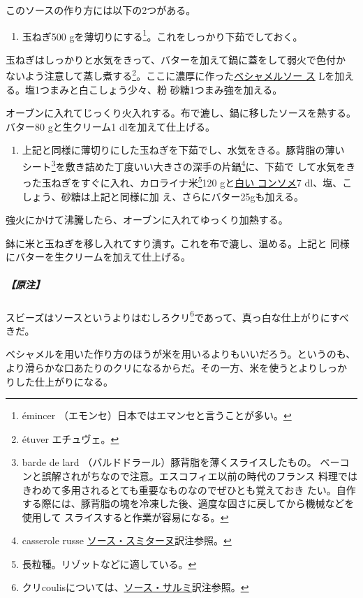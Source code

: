 \begin{recette}
このソースの作り方には以下の2つがある。

\begin{enumerate}
\def\labelenumi{\arabic{enumi}.}
\tightlist
\item
  玉ねぎ500 gを薄切りにする\footnote{émincer
    （エモンセ）日本ではエマンセと言うことが多い。}。これをしっかり下茹でしておく。
\end{enumerate}

玉ねぎはしっかりと水気をきって、バターを加えて鍋に蓋をして弱火で色付か
ないよう注意して蒸し煮する\footnote{étuver エチュヴェ。}。ここに濃厚に作った\protect\hyperlink{sauce-bechamel}{ベシャメルソー
ス}\undemi{} Lを加える。塩1つまみと白こしょう少々、粉
砂糖1つまみ強を加える。

オーブンに入れてじっくり火入れする。布で漉し、鍋に移したソースを熱する。
バター80 gと生クリーム1 dlを加えて仕上げる。

\begin{enumerate}
\def\labelenumi{\arabic{enumi}.}
\setcounter{enumi}{1}
\tightlist
\item
  上記と同様に薄切りにした玉ねぎを下茹でし、水気をきる。豚背脂の薄い
  シート\footnote{barde de lard
    （バルドドラール）豚背脂を薄くスライスしたもの。
    ベーコンと誤解されがちなので注意。エスコフィエ以前の時代のフランス
    料理ではきわめて多用されるとても重要なものなのでぜひとも覚えておき
    たい。自作する際には、豚背脂の塊を冷凍した後、適度な固さに戻してから機械などを使用して
    スライスすると作業が容易になる。}を敷き詰めた丁度いい大きさの深手の片鍋\footnote{casserole
    russe
    \protect\hyperlink{sauce-smitane}{ソース・スミターヌ}訳注参照。}に、下茹で
  して水気をきった玉ねぎをすぐに入れ、カロライナ米\footnote{長粒種。リゾットなどに適している。}120
  gと\protect\hyperlink{consomme-blanc}{白い コンソメ}7
  dl、塩、こしょう、砂糖は上記と同様に加 え、さらにバター25gも加える。
\end{enumerate}

強火にかけて沸騰したら、オーブンに入れてゆっくり加熱する。

鉢に米と玉ねぎを移し入れてすり潰す。これを布で漉し、温める。上記と
同様にバターを生クリームを加えて仕上げる。

\hypertarget{nota-sauce-soubise}{%
\subparagraph{【原注】}\label{nota-sauce-soubise}}

スビーズはソースというよりはむしろクリ\footnote{クリcoulisについては、\protect\hyperlink{sauce-salmis}{ソース・サルミ}訳注参照。}であって、真っ白な仕上がりにすべきだ。

ベシャメルを用いた作り方のほうが米を用いるよりもいいだろう。というのも、
より滑らかな口あたりのクリになるからだ。その一方、米を使うとよりしっか
りした仕上がりになる。


\end{recette}
